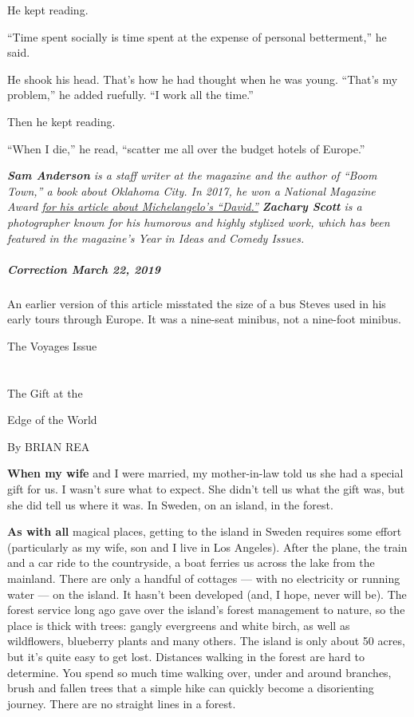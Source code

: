 He kept reading.

``Time spent socially is time spent at the expense of personal
betterment,'' he said.

He shook his head. That's how he had thought when he was young. ``That's
my problem,'' he added ruefully. ``I work all the time.''

Then he kept reading.

``When I die,'' he read, ``scatter me all over the budget hotels of
Europe.''

\emph{\textbf{Sam Anderson} is a staff writer at the magazine and the
author of ``Boom Town,'' a book about Oklahoma City. In 2017, he won a
National Magazine Award
\href{https://www.nytimes3xbfgragh.onion/2016/08/21/magazine/davids-ankles-how-imperfections-could-bring-down-the-worlds-most-perfect-statue.html}{for
his article about Michelangelo's ``David.''} \textbf{Zachary Scott} is a
photographer known for his humorous and highly stylized work, which has
been featured in the magazine's Year in Ideas and Comedy Issues.}

\hypertarget{correction-march-22-2019}{%
\subparagraph{\texorpdfstring{\textbf{Correction} March 22,
2019}{Correction March 22, 2019}}\label{correction-march-22-2019}}

An earlier version of this article misstated the size of a bus Steves
used in his early tours through Europe. It was a nine-seat minibus, not
a nine-foot minibus.

The Voyages Issue

\hypertarget{-6}{%
\section{}\label{-6}}

The Gift at the

Edge of the World

By BRIAN REA

\textbf{When my wife} and I were married, my mother-in-law told us she
had a special gift for us. I wasn't sure what to expect. She didn't tell
us what the gift was, but she did tell us where it was. In Sweden, on an
island, in the forest.

\textbf{As with all} magical places, getting to the island in Sweden
requires some effort (particularly as my wife, son and I live in Los
Angeles). After the plane, the train and a car ride to the countryside,
a boat ferries us across the lake from the mainland. There are only a
handful of cottages --- with no electricity or running water --- on the
island. It hasn't been developed (and, I hope, never will be). The
forest service long ago gave over the island's forest management to
nature, so the place is thick with trees: gangly evergreens and white
birch, as well as wildflowers, blueberry plants and many others. The
island is only about 50 acres, but it's quite easy to get lost.
Distances walking in the forest are hard to determine. You spend so much
time walking over, under and around branches, brush and fallen trees
that a simple hike can quickly become a disorienting journey. There are
no straight lines in a forest.

